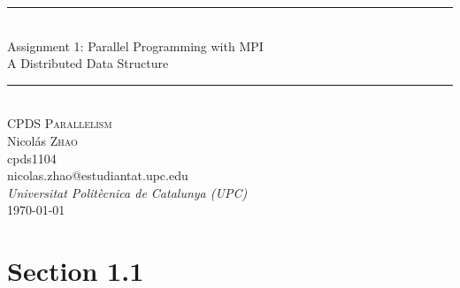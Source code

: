\documentclass{article}
\makeatletter
\newcommand{\horrule}[1]{\rule{\linewidth}{#1}} %
\def\firstName{Nicolás}
\def\lastName{Zhao}
\def\machine{cpds1104}
\def\subject{CPDS Parallelism}
\def\email{nicolas.zhao@estudiantat.upc.edu}
\def\institute{Universitat Politècnica de Catalunya (UPC)}
\def\title{
        {\huge Assignment 1: Parallel Programming with MPI}\\
        [0.2cm]
        {\huge A Distributed Data Structure}\\
}
\makeatother
\begin{document}
    \begin{titlepage}
        \vspace*{\fill}
        \center
        \horrule{0.5pt} \\[0.4cm] %
        \title
        \horrule{0.5pt} \\[0.6cm] %

        \textsc{\large\subject}\\[0.5cm]
         

        \large{\firstName} \textsc{\lastName}\\
        \machine\\
        \email\\[0.6cm]
        \emph{\institute}\\[0.5cm]


        {\large \today}\\[2cm] %

        \vspace*{\fill}
    \end{titlepage}

    \setcounter{secnumdepth}{0}

    \section{Section 1.1}
\end{document}
